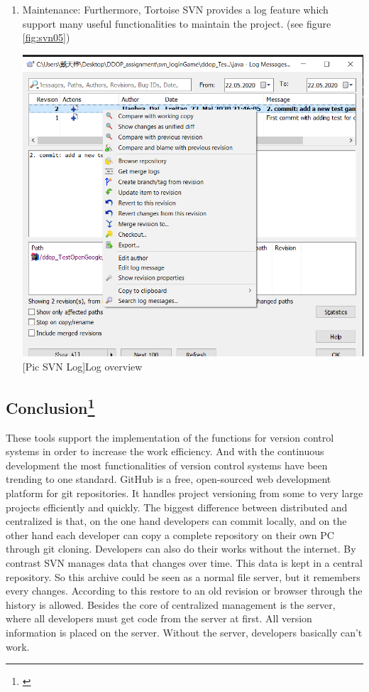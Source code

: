 \documentclass[12pt,a4paper,bibliography=totocnumbered,listof=totocnumbered]{article}
\begin{document}
\begin{enumerate}
\begin{figure}[H]
	\end{figure} %
	\item Maintenance: Furthermore, Tortoise SVN provides a log feature which support many useful functionalities to maintain the project. (see figure \ref{fig:svn05})
	\vspace{1em}\\
	\begin{minipage}{\linewidth}
		\centering
		\includegraphics[width=0.5\linewidth]{pics/svnLog.png}
		[Pic SVN Log]{Log overview}
		\label{fig:svn05}
	\end{minipage}  
\end{enumerate} 

\subsection[Conclusion]{Conclusion\footnote[6]{\cite{ref6}}}
These tools support the implementation of the functions for version control systems in order to increase the work efficiency.
And with the continuous development the most functionalities of version control systems have been trending to one standard.
GitHub is a free, open-sourced web development platform for git repositories. It handles project versioning from some to very large projects efficiently and quickly.
The biggest difference between distributed and centralized is that, on the one hand developers can commit locally, 
and on the other hand each developer can copy a complete repository on their own PC through git cloning. Developers can also do their works without the internet. 
\newline
By contrast SVN manages data that changes over time. This data is kept in a central repository. So this archive could be seen as a normal file server, but it remembers
every changes. According to this restore to an old revision or browser through the history is allowed. Besides the core of centralized management is the server, 
where all developers must get code from the server at first. All version information is placed on the server. Without the server, developers basically can't work.
\end{document}
